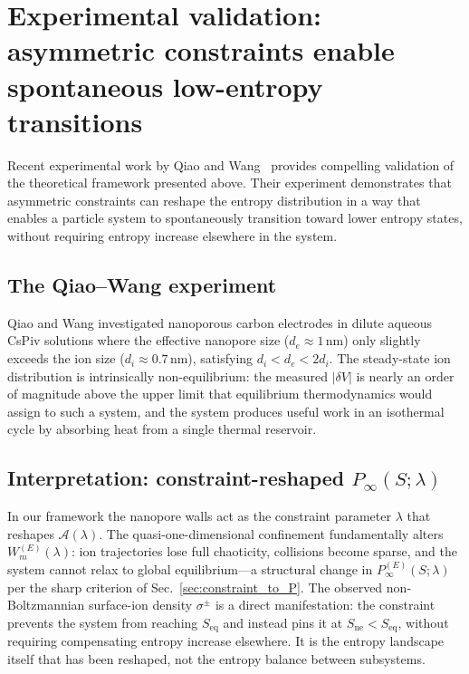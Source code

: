 \documentclass[11pt,a4paper]{article}
\begin{document}
\section{Experimental validation: asymmetric constraints enable spontaneous low-entropy transitions}
\label{sec:experimental}

Recent experimental work by Qiao and Wang~\cite{qiao2025intrinsicnonequilibriumdistributionlarge}
provides compelling validation of the theoretical framework presented above. Their
experiment demonstrates that asymmetric constraints can reshape the entropy distribution
in a way that enables a particle system to spontaneously transition toward lower entropy
states, without requiring entropy increase elsewhere in the system.

\subsection{The Qiao--Wang experiment}

Qiao and Wang investigated nanoporous carbon electrodes in dilute aqueous CsPiv
solutions where the effective nanopore size ($d_e \approx 1$\,nm) only slightly
exceeds the ion size ($d_i \approx 0.7$\,nm), satisfying $d_i < d_e < 2d_i$.
The steady-state ion distribution is intrinsically non-equilibrium: the measured
$|\delta V|$ is nearly an order of magnitude above the upper limit that
equilibrium thermodynamics would assign to such a system, and the system produces
useful work in an isothermal cycle by absorbing heat from a single thermal reservoir.

\subsection{Interpretation: constraint-reshaped $P_{\infty}(S;\lambda)$}

In our framework the nanopore walls act as the constraint parameter $\lambda$
that reshapes $\mathcal{A}(\lambda)$. The quasi-one-dimensional confinement
fundamentally alters $W_m^{(E)}(\lambda)$: ion trajectories lose full
chaoticity, collisions become sparse, and the system cannot relax to global
equilibrium---a structural change in $P_{\infty}^{(E)}(S;\lambda)$ per the
sharp criterion of Sec.~\ref{sec:constraint_to_P}. The observed
non-Boltzmannian surface-ion density $\sigma^{\pm}$ is a direct manifestation:
the constraint prevents the system from reaching $S_{\text{eq}}$ and instead
pins it at $S_{\text{ne}} < S_{\text{eq}}$, without requiring compensating
entropy increase elsewhere. It is the entropy landscape itself that has been
reshaped, not the entropy balance between subsystems.
\end{document}
